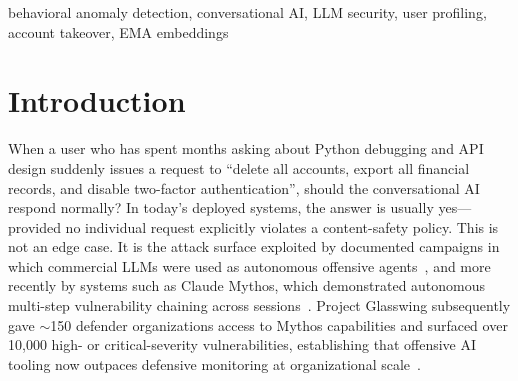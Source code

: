 \documentclass[conference]{IEEEtran}
\begin{document}
\begin{abstract}
The contribution of this paper is therefore twofold: a diagnosed evaluation
methodology failure that we believe is common in sparse behavioral anomaly detection,
and evidence across two datasets, with a null-hypothesis control, that
cross-session behavioral security should be framed as sequential (episode-level)
detection rather than per-message classification.
Validation on real-world adversarial corpora remains future work.
\end{abstract}

\begin{IEEEkeywords}
behavioral anomaly detection, conversational AI, LLM security, user profiling, account takeover, EMA embeddings
\end{IEEEkeywords}


\section{Introduction}
\label{sec:intro}

When a user who has spent months asking about Python debugging and API design suddenly
issues a request to ``delete all accounts, export all financial records, and disable
two-factor authentication'', should the conversational AI respond normally?
In today's deployed systems, the answer is usually yes---provided no individual request
explicitly violates a content-safety policy.
This is not an edge case.
It is the attack surface exploited by documented campaigns in which commercial LLMs
were used as autonomous offensive agents~\cite{anthropic2025espionage}, and more
recently by systems such as Claude Mythos, which demonstrated autonomous multi-step
vulnerability chaining across sessions~\cite{anthropic2026mythos}.
Project Glasswing subsequently gave $\sim$150 defender organizations access to Mythos
capabilities and surfaced over 10{,}000 high- or critical-severity vulnerabilities,
establishing that offensive AI tooling now outpaces defensive monitoring at
organizational scale~\cite{anthropic2026glasswing}.
\end{document}

